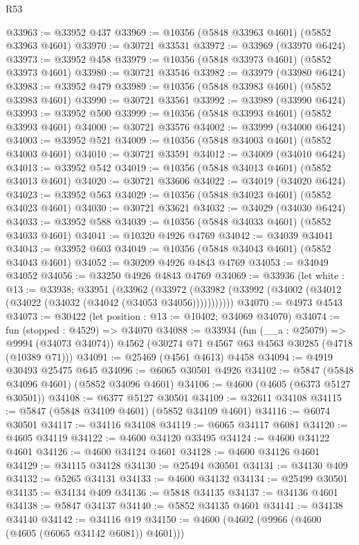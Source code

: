 \begin{lexlean}{R53}
\begin{coremodule}
@33963 := @33952 @437
@33969 := @10356 (@5848 @33963 @4601) (@5852 @33963 @4601)
@33970 := @30721 @33531
@33972 := @33969 (@33970 @6424)
@33973 := @33952 @458
@33979 := @10356 (@5848 @33973 @4601) (@5852 @33973 @4601)
@33980 := @30721 @33546
@33982 := @33979 (@33980 @6424)
@33983 := @33952 @479
@33989 := @10356 (@5848 @33983 @4601) (@5852 @33983 @4601)
@33990 := @30721 @33561
@33992 := @33989 (@33990 @6424)
@33993 := @33952 @500
@33999 := @10356 (@5848 @33993 @4601) (@5852 @33993 @4601)
@34000 := @30721 @33576
@34002 := @33999 (@34000 @6424)
@34003 := @33952 @521
@34009 := @10356 (@5848 @34003 @4601) (@5852 @34003 @4601)
@34010 := @30721 @33591
@34012 := @34009 (@34010 @6424)
@34013 := @33952 @542
@34019 := @10356 (@5848 @34013 @4601) (@5852 @34013 @4601)
@34020 := @30721 @33606
@34022 := @34019 (@34020 @6424)
@34023 := @33952 @563
@34029 := @10356 (@5848 @34023 @4601) (@5852 @34023 @4601)
@34030 := @30721 @33621
@34032 := @34029 (@34030 @6424)
@34033 := @33952 @588
@34039 := @10356 (@5848 @34033 @4601) (@5852 @34033 @4601)
@34041 := @10320 @4926 @4769
@34042 := @34039 @34041
@34043 := @33952 @603
@34049 := @10356 (@5848 @34043 @4601) (@5852 @34043 @4601)
@34052 := @30209 @4926 @4843 @4769
@34053 := @34049 @34052
@34056 := @33250 @4926 @4843 @4769
@34069 := @33936
    (let white : @13 := @33938;
    @33951
      (@33962
        (@33972 (@33982 (@33992 (@34002 (@34012 (@34022 (@34032 (@34042 (@34053 @34056)))))))))))
@34070 := @4973 @4543
@34073 := @30422 (let position : @13 := @10402; @34069 @34070)
@34074 := fun (stopped : @4529) => @34070
@34088 := @33934
    (fun (__a : @25079) => @9994 (@34073 @34074))
    @4562
    (@30274 @71 @4567 @63 @4563 @30285 (@4718 (@10389 @71)))
@34091 := @25469 (@4561 @4613) @4458
@34094 := @4919 @30493 @25475 @645
@34096 := @6065 @30501 @4926
@34102 := @5847 (@5848 @34096 @4601) (@5852 @34096 @4601)
@34106 := @4600 (@4605 (@6373 @5127 @30501))
@34108 := @6377 @5127 @30501
@34109 := @32611 @34108
@34115 := @5847 (@5848 @34109 @4601) (@5852 @34109 @4601)
@34116 := @6074 @30501
@34117 := @34116 @34108
@34119 := @6065 @34117 @6081
@34120 := @4605 @34119
@34122 := @4600 @34120 @33495
@34124 := @4600 @34122 @4601
@34126 := @4600 @34124 @4601
@34128 := @4600 @34126 @4601
@34129 := @34115 @34128
@34130 := @25494 @30501
@34131 := @34130 @409
@34132 := @5265 @34131
@34133 := @4600 @34132
@34134 := @25499 @30501
@34135 := @34134 @409
@34136 := @5848 @34135
@34137 := @34136 @4601
@34138 := @5847 @34137
@34140 := @5852 @34135 @4601
@34141 := @34138 @34140
@34142 := @34116 @19
@34150 := @4600 (@4602 (@9966 (@4600 (@4605 (@6065 @34142 @6081)) @4601)))

\end{coremodule}
\end{lexlean}
